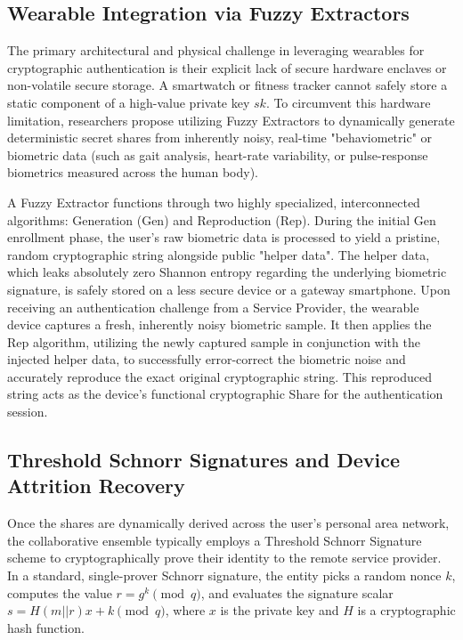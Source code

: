 \documentclass[11pt, a4paper]{article}
\begin{document}
\subsection*{Wearable Integration via Fuzzy Extractors}
The primary architectural and physical challenge in leveraging wearables for cryptographic authentication is their explicit lack of secure hardware enclaves or non-volatile secure storage. A smartwatch or fitness tracker cannot safely store a static component of a high-value private key $sk$. To circumvent this hardware limitation, researchers propose utilizing Fuzzy Extractors to dynamically generate deterministic secret shares from inherently noisy, real-time "behaviometric" or biometric data (such as gait analysis, heart-rate variability, or pulse-response biometrics measured across the human body).

A Fuzzy Extractor functions through two highly specialized, interconnected algorithms: Generation (Gen) and Reproduction (Rep). During the initial Gen enrollment phase, the user's raw biometric data is processed to yield a pristine, random cryptographic string alongside public "helper data". The helper data, which leaks absolutely zero Shannon entropy regarding the underlying biometric signature, is safely stored on a less secure device or a gateway smartphone. Upon receiving an authentication challenge from a Service Provider, the wearable device captures a fresh, inherently noisy biometric sample. It then applies the Rep algorithm, utilizing the newly captured sample in conjunction with the injected helper data, to successfully error-correct the biometric noise and accurately reproduce the exact original cryptographic string. This reproduced string acts as the device's functional cryptographic Share for the authentication session.

\subsection*{Threshold Schnorr Signatures and Device Attrition Recovery}
Once the shares are dynamically derived across the user's personal area network, the collaborative ensemble typically employs a Threshold Schnorr Signature scheme to cryptographically prove their identity to the remote service provider. In a standard, single-prover Schnorr signature, the entity picks a random nonce $k$, computes the value $r = g^k \pmod q$, and evaluates the signature scalar $s = H(m||r)x + k \pmod q$, where $x$ is the private key and $H$ is a cryptographic hash function.
\end{document}
